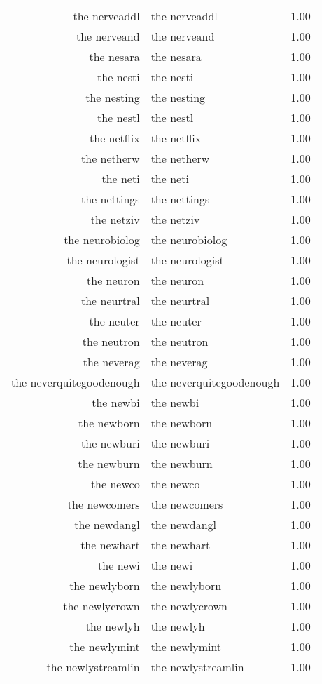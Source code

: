 \begin{table}[ht]
\begin{tabular}{rlr}
  the nerveaddl & the nerveaddl & 1.00 \\ 
  the nerveand & the nerveand & 1.00 \\ 
  the nesara & the nesara & 1.00 \\ 
  the nesti & the nesti & 1.00 \\ 
  the nesting & the nesting & 1.00 \\ 
  the nestl & the nestl & 1.00 \\ 
  the netflix & the netflix & 1.00 \\ 
  the netherw & the netherw & 1.00 \\ 
  the neti & the neti & 1.00 \\ 
  the nettings & the nettings & 1.00 \\ 
  the netziv & the netziv & 1.00 \\ 
  the neurobiolog & the neurobiolog & 1.00 \\ 
  the neurologist & the neurologist & 1.00 \\ 
  the neuron & the neuron & 1.00 \\ 
  the neurtral & the neurtral & 1.00 \\ 
  the neuter & the neuter & 1.00 \\ 
  the neutron & the neutron & 1.00 \\ 
  the neverag & the neverag & 1.00 \\ 
  the neverquitegoodenough & the neverquitegoodenough & 1.00 \\ 
  the newbi & the newbi & 1.00 \\ 
  the newborn & the newborn & 1.00 \\ 
  the newburi & the newburi & 1.00 \\ 
  the newburn & the newburn & 1.00 \\ 
  the newco & the newco & 1.00 \\ 
  the newcomers & the newcomers & 1.00 \\ 
  the newdangl & the newdangl & 1.00 \\ 
  the newhart & the newhart & 1.00 \\ 
  the newi & the newi & 1.00 \\ 
  the newlyborn & the newlyborn & 1.00 \\ 
  the newlycrown & the newlycrown & 1.00 \\ 
  the newlyh & the newlyh & 1.00 \\ 
  the newlymint & the newlymint & 1.00 \\ 
  the newlystreamlin & the newlystreamlin & 1.00 \\ 

\end{tabular}
\end{table}
